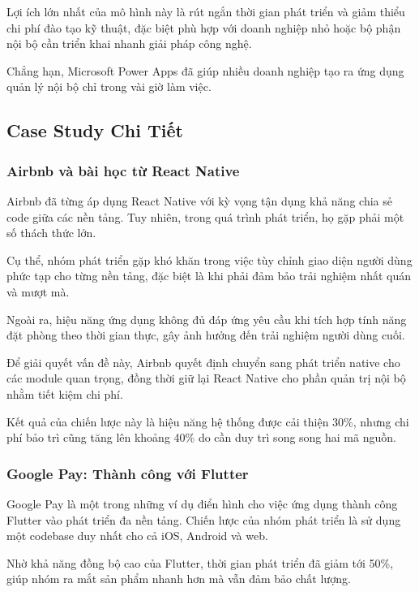 Lợi ích lớn nhất của mô hình này là rút ngắn thời gian phát triển và giảm thiểu chi phí đào tạo kỹ thuật,  
đặc biệt phù hợp với doanh nghiệp nhỏ hoặc bộ phận nội bộ cần triển khai nhanh giải pháp công nghệ.

Chẳng hạn, Microsoft Power Apps đã giúp nhiều doanh nghiệp tạo ra ứng dụng quản lý nội bộ chỉ trong vài giờ làm việc.


\subsection{Case Study Chi Tiết}
\renewcommand{\labelitemi}{--}

\subsubsection{Airbnb và bài học từ React Native}

Airbnb đã từng áp dụng React Native với kỳ vọng tận dụng khả năng chia sẻ code giữa các nền tảng.  
Tuy nhiên, trong quá trình phát triển, họ gặp phải một số thách thức lớn.

Cụ thể, nhóm phát triển gặp khó khăn trong việc tùy chỉnh giao diện người dùng phức tạp cho từng nền tảng,  
đặc biệt là khi phải đảm bảo trải nghiệm nhất quán và mượt mà.

Ngoài ra, hiệu năng ứng dụng không đủ đáp ứng yêu cầu khi tích hợp tính năng đặt phòng theo thời gian thực,  
gây ảnh hưởng đến trải nghiệm người dùng cuối.

Để giải quyết vấn đề này, Airbnb quyết định chuyển sang phát triển native cho các module quan trọng,  
đồng thời giữ lại React Native cho phần quản trị nội bộ nhằm tiết kiệm chi phí.

Kết quả của chiến lược này là hiệu năng hệ thống được cải thiện 30\%,  
nhưng chi phí bảo trì cũng tăng lên khoảng 40\% do cần duy trì song song hai mã nguồn.

\vspace{0.5cm}

\subsubsection{Google Pay: Thành công với Flutter}

Google Pay là một trong những ví dụ điển hình cho việc ứng dụng thành công Flutter vào phát triển đa nền tảng.  
Chiến lược của nhóm phát triển là sử dụng một codebase duy nhất cho cả iOS, Android và web.

Nhờ khả năng đồng bộ cao của Flutter, thời gian phát triển đã giảm tới 50\%,  
giúp nhóm ra mắt sản phẩm nhanh hơn mà vẫn đảm bảo chất lượng.

